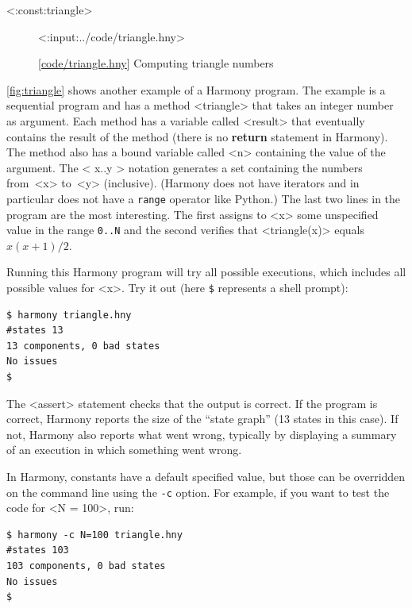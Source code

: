 \documentclass{report}
\newcommand{\harmonylink}[1]{%
[\href{https://harmony.cs.cornell.edu/#1}{\underline{#1}}]%
}
\newenvironment{code}{
\tcolorbox
}{
\endtcolorbox
}
\begin{document}
<{:const:triangle}>

\begin{figure}
\begin{code}
<{:input:../code/triangle.hny}>
\end{code}
\caption{\harmonylink{code/triangle.hny} Computing triangle numbers}
\label{fig:triangle}
\end{figure}

\autoref{fig:triangle} shows another example of a Harmony program.
The example is a sequential program
and has a method <{triangle}> that takes
an integer number as argument.  Each method has a variable called
<{result}> that eventually contains the result of the
method (there is no \textbf{return} statement in Harmony).  The method
also has a bound variable called <{n}> containing the value of the
argument.  The <{{ x..y }}> notation generates a set containing the numbers
from~<{x}> to~<{y}> (inclusive).
(Harmony does not have iterators and in particular does
not have a \texttt{range} operator like Python.)
The last two lines in the program are
the most interesting.
The first assigns to <{x}> some unspecified value in the range \texttt{0..N}
and the second verifies that <{triangle(x)}> equals $x(x+1)/2$.

Running this Harmony program will try all possible executions, which
includes all possible values for <{x}>.  Try it out (here \texttt{\$}
represents a shell prompt):

\begin{code}
\begin{verbatim}
$ harmony triangle.hny
#states 13
13 components, 0 bad states
No issues
$
\end{verbatim}
\end{code}

The <{assert}> statement checks that the output is
correct.  If the program is correct, Harmony reports the size of the
``state graph'' (13 states in this case).  If not, Harmony also
reports what went wrong, typically by displaying a summary of an execution in
which something went wrong.

In Harmony, constants have a default specified value,
but those can be overridden on the command
line using the \texttt{-c} option.
%
For example, if you want to test the code for <{N = 100}>, run:
\begin{code}
\begin{verbatim}
$ harmony -c N=100 triangle.hny
#states 103
103 components, 0 bad states
No issues
$
\end{verbatim}
\end{code}
\end{document}
